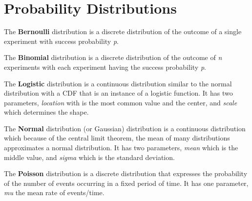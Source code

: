 \section{Probability Distributions}

\newcommand{\distname}[1]{\textbf{#1}}

\newcommand{\distattrib}[1]{\textit{#1}}


The \distname{Bernoulli} distribution is a discrete distribution of
the outcome of a single experiment with success probability
\distattrib{p}.


The \distname{Binomial} distribution is a discrete distribution of the
outcome of \distattrib{n} experiments with each experiment having the
success probability \distattrib{p}.



The \distname{Logistic} distribution is a continuous distribution
similar to the normal distribution with a CDF that is an instance of a
logistic function.  It has two parameters, \distattrib{location} with
is the most common value and the center, and \distattrib{scale} which
determines the shape.



The \distname{Normal} distribution (or Gaussian) distribution is a
continuous distribution which because of the central limit theorem,
the mean of many distributions approximates a normal distribution.  It
has two parameters, \distattrib{mean} which is the middle value, and
\distattrib{sigma} which is the standard deviation.


The \distname{Poisson} distribution is a discrete distribution that
expresses the probability of the number of events occurring in a fixed
period of time.  It has one parameter, \distattrib{mu} the mean rate
of events/time.


